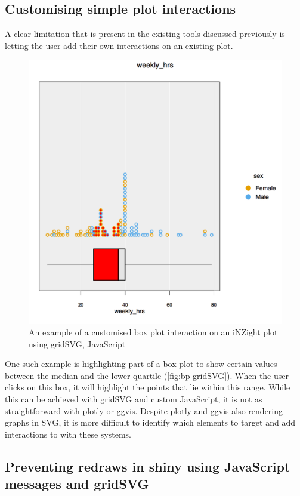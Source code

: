 \documentclass[11pt,]{report}
\begin{document}
\subsection{Customising simple plot
interactions}\label{customising-simple-plot-interactions}

A clear limitation that is present in the existing tools discussed
previously is letting the user add their own interactions on an existing
plot.

\begin{figure}[H]

{\centering \includegraphics[width=0.7\linewidth,]{./fig/bp-gridSVG} 

}

\caption{\label{fig:bp-gridSVG} An example of a customised box plot interaction on an iNZight plot using gridSVG, JavaScript}\label{fig:unnamed-chunk-35}
\end{figure}

One such example is highlighting part of a box plot to show certain
values between the median and the lower quartile
(\autoref{fig:bp-gridSVG}). When the user clicks on this box, it will
highlight the points that lie within this range. While this can be
achieved with \textsf{gridSVG} and custom JavaScript, it is not as
straightforward with \textsf{plotly} or \textsf{ggvis}. Despite
\textsf{plotly} and \textsf{ggvis} also rendering graphs in SVG, it is
more difficult to identify which elements to target and add interactions
to with these systems.

\subsection{Preventing redraws in shiny using JavaScript messages and
gridSVG}\label{preventing-redraws-in-shiny-using-javascript-messages-and-gridsvg}
\end{document}
